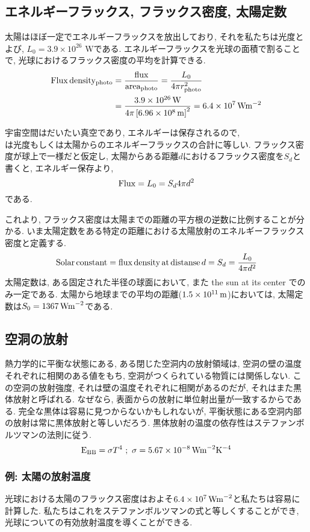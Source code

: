 \documentclass[a4j,12pt,openbib,oneside,dvipdfmx]{jbook}
\begin{document}
\subsection{エネルギーフラックス, フラックス密度, 太陽定数}
\par
太陽はほぼ一定でエネルギーフラックスを放出しており, それを私たちは光度とよび, $L_0=3.9\times10^{26}$ Wである.
エネルギーフラックスを光球の面積で割ることで, 光球におけるフラックス密度の平均を計算できる. 
\begin{align}
  \rm{Flux\, density_{photo}}&=\frac{\rm{flux}}{\rm{area_{photo}}}=\frac{L_0}{4\pi{r^2_{\rm{photo}}}} \nonumber \\
  &=\frac{3.9\times10^{26}\,\rm{W}}{4\pi\left[6.96\times10^8\,\rm{m}\right]^2}=6.4\times10^7\,\rm{Wm^{-2}}
\end{align}
\par
宇宙空間はだいたい真空であり, エネルギーは保存されるので, \\
は光度もしくは太陽からのエネルギーフラックスの合計に等しい. フラックス密度が球上で一様だと仮定し, 太陽からある距離$d$におけるフラックス密度を$S_d$と書くと, エネルギー保存より,
\begin{equation}
  {\rm{Flux}}={L_0}={S_d}4\pi{d^2}
\end{equation}
である.
\par
これより, フラックス密度は太陽までの距離の平方根の逆数に比例することが分かる. いま太陽定数をある特定の距離における太陽放射のエネルギーフラックス密度と定義する.
\begin{equation}
  {\rm{Solar}}\,{\rm{constant}}={\rm{flux}}\,{\rm{density}}\,{\rm{at}}\,{\rm{distanse}}\, d=S_d=\frac{L_0}{4\pi{d^2}}
\end{equation}
太陽定数は, ある固定された半径の球面において, また the sun at its center でのみ一定である. 太陽から地球までの平均の距離($1.5\times10^{11}\,\rm{m}$)においては, 太陽定数は$S_0=1367\,\rm{Wm}^{-2}$である.

\subsection{空洞の放射}
\par
熱力学的に平衡な状態にある, ある閉じた空洞内の放射領域は, 空洞の壁の温度それぞれに相関のある値をもち, 空洞がつくられている物質には関係しない. 
この空洞の放射強度, それは壁の温度それぞれに相関があるのだが, それはまた黒体放射と呼ばれる. なぜなら, 表面からの放射に単位射出量が一致するからである. 
完全な黒体は容易に見つからないかもしれないが, 平衡状態にある空洞内部の放射は常に黒体放射と等しいだろう. 
黒体放射の温度の依存性はステファンボルツマンの法則に従う.
\begin{equation}
  {\rm{E_{BB}}}=\sigma{T^4}\,\,;\,\,\sigma=5.67\times10^{-8}\,\rm{Wm}^{-2}\rm{K}^{-4}
\end{equation}

\subsubsection{例: 太陽の放射温度}
光球における太陽のフラックス密度はおよそ$6.4\times10^7\,\rm{Wm}^{-2}$と私たちは容易に計算した. 私たちはこれをステファンボルツマンの式と等しくすることができ, 光球についての有効放射温度を導くことができる. 
\end{document}
